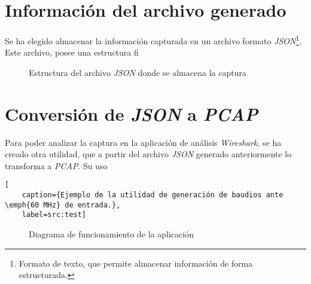 \section{Información del archivo generado}
Se ha elegido almacenar la información capturada en un archivo formato \emph{JSON}\footnote{Formato de texto, que permite almacenar información de forma estructurada.}.
Este archivo, posee una estructura fi

\begin{figure}[!hbtp]
    \centering
    \begin{minipage}{6cm}
    \end{minipage}
    \caption{Estructura del archivo \emph{JSON} donde se almacena la captura}
    \label{fig:tree-json}
\end{figure}

\section{Conversión de \emph{JSON} a \emph{PCAP}}
Para poder analizar la captura en la aplicación de análisis \emph{Wireshark}, se ha creado otra utilidad, que a partir del archivo \emph{JSON} generado anteriormente lo transforma a \emph{PCAP}.
Su uso 

\begin{lstlisting}[
    caption={Ejemplo de la utilidad de generación de baudios ante \emph{60 MHz} de entrada.},
    label=src:test]
\end{lstlisting}

\begin{figure}[!hbt]
    \centering
    \scalebox{0.8} {}
    \caption{Diagrama de funcionamiento de la aplicación}
    \label{fig:flujo_app}
\end{figure}



